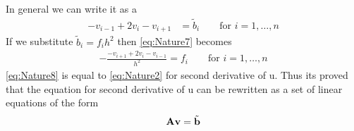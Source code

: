 In general we can write it as a 
\begin{align}
	-v_{i-1} + 2v_i -v_{i+1} &= \tilde{b}_i \qquad \text{for } i = 1,\dots , n
	\label{eq:Nature7}
\end{align}
If we substitute $\tilde{b}_i = f_i h^2$ then \eqref{eq:Nature7} becomes
\begin{align}
	-\frac{-v_{i+1}+2v_i-v_{i-1}}{h^2} = f_i  \qquad \text{for } i=1,\dots, n
	\label{eq:Nature8}
\end{align}
\eqref{eq:Nature8} is equal to \eqref{eq:Nature2} for second derivative of u. 
Thus its proved that the equation for second derivative of u can be rewritten as a set of linear equations of the form
\begin{align}
	\mbox{\textbf{A}} \mbox{\textbf{v}} = \tilde{\mbox{\textbf{b}}}
	\label{eq:Nature9}
\end{align}
